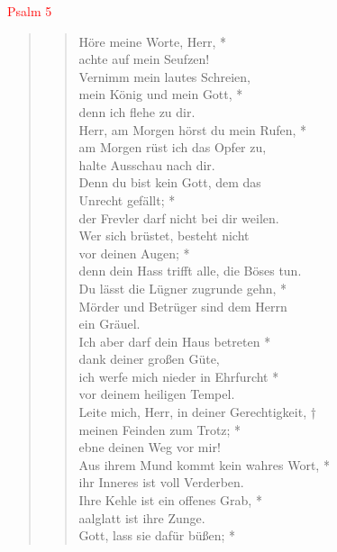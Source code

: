 
\begin{center}
 \textcolor{red}{Psalm 5}\\

\end{center}
\begin{quote}
 


\begin{verse}
Höre meine Worte, Herr, *\\ 
achte auf mein Seufzen!\\ 
\vin Vernimm mein lautes Schreien,\\ 
\vin mein König und mein Gott, *\\ 
\vin denn ich flehe zu dir.\\  
Herr, am Morgen hörst du mein Rufen, *\\ 
am Morgen rüst ich das Opfer zu, \\
halte Ausschau nach dir.\\ 
\vin Denn du bist kein Gott, dem das\\ 
\vin Unrecht gefällt; *\\ 
\vin der Frevler darf nicht bei dir weilen.\\  
Wer sich brüstet, besteht nicht\\
vor deinen Augen; *\\ 
denn dein Hass trifft alle, die Böses tun.\\ 
\vin Du lässt die Lügner zugrunde gehn, *\\ 
\vin Mörder und Betrüger sind dem Herrn\\ 
\vin ein Gräuel.\\ 
Ich aber darf dein Haus betreten *\\ 
dank deiner großen Güte,\\ 
\vin ich werfe mich nieder in Ehrfurcht *\\ 
\vin vor deinem heiligen Tempel.\\ 
Leite mich, Herr, in deiner Gerechtigkeit, †\\
meinen Feinden zum Trotz; *\\  
ebne deinen Weg vor mir!\\ 
\vin Aus ihrem Mund kommt kein wahres Wort, *\\ 
\vin ihr Inneres ist voll Verderben.\\  
Ihre Kehle ist ein offenes Grab, *\\  
aalglatt ist ihre Zunge.\\ 
\vin Gott, lass sie dafür büßen; *\\ 

\end{verse}
\end{quote}
